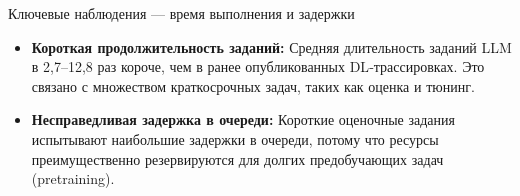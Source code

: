 \begin{frame}{Ключевые наблюдения — время выполнения и задержки}
	\begin{itemize}
		\item \textbf{Короткая продолжительность заданий:} 
		Средняя длительность заданий LLM в 2,7–12,8 раз короче, чем в ранее опубликованных DL‑трассировках. 
		Это связано с множеством краткосрочных задач, таких как оценка и тюнинг.
		
		\item \textbf{Несправедливая задержка в очереди:} 
		Короткие оценочные задания испытывают наибольшие задержки в очереди, 
		потому что ресурсы преимущественно резервируются для долгих предобучающих задач (pretraining).
	\end{itemize}
\end{frame}